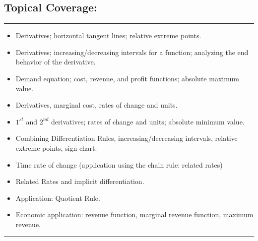 \subsection*{Topical Coverage:}
{
\noindent
    \rule{\textwidth}{1pt}
    \vspace{1ex}
}
\begin{itemize}[leftmargin=*]
\item Derivatives; horizontal tangent lines; relative extreme points.
\item Derivatives; increasing/decreasing intervals for a function; analyzing the end behavior of the derivative.
\item Demand equation; cost, revenue, and profit functions; absolute maximum value.
\item Derivatives, marginal cost, rates of change and units.
\item $1^{st}$ and $2^{nd}$ derivatives; rates of change and units; absolute minimum value.
\item Combining Differentiation Rules, increasing/decreasing intervals, relative extreme points, sign chart.
\item Time rate of change (application using the chain rule: related rates)
\item Related Rates and implicit differentiation.
\item Application:  Quotient Rule. 
\item Economic application: revenue function, marginal revenue function, maximum revenue.
\end{itemize}
\newpage
{
\noindent
    \rule{\textwidth}{1pt}
    \vspace{1ex}
}
  \vspace{-0.25in}
